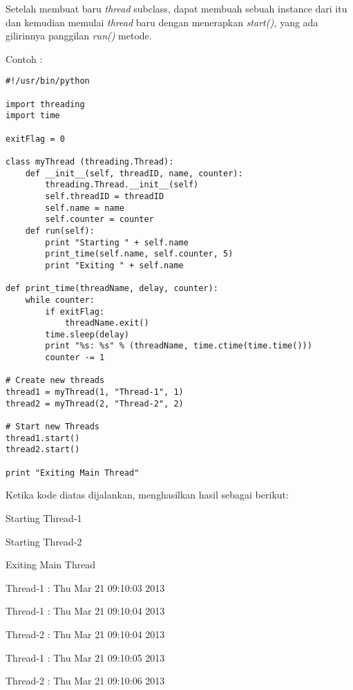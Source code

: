 \documentclass [12pt,a4paper,notitlepage,oneside,bahasa]{article}
\begin{document}
\vspace{12pt}
Setelah membuat baru \textit{thread} subclass, dapat membuah sebuah instance dari itu dan kemudian memulai \textit{thread} baru dengan menerapkan \textit{start(),} yang ada gilirinnya panggilan \textit{run()} metode. \par
\vspace{12pt}
	Contoh :
\begin{verbatim}
#!/usr/bin/python

import threading
import time

exitFlag = 0

class myThread (threading.Thread):
    def __init__(self, threadID, name, counter):
        threading.Thread.__init__(self)
        self.threadID = threadID
        self.name = name
        self.counter = counter
    def run(self):
        print "Starting " + self.name
        print_time(self.name, self.counter, 5)
        print "Exiting " + self.name

def print_time(threadName, delay, counter):
    while counter:
        if exitFlag:
            threadName.exit()
        time.sleep(delay)
        print "%s: %s" % (threadName, time.ctime(time.time()))
        counter -= 1

# Create new threads
thread1 = myThread(1, "Thread-1", 1)
thread2 = myThread(2, "Thread-2", 2)

# Start new Threads
thread1.start()
thread2.start()

print "Exiting Main Thread"
\end{verbatim}
	Ketika kode diatas dijalankan, menghasilkan hasil sebagai berikut:
\par
\noindent 
{\fontsize{10pt}{10pt}\selectfont Starting Thread-1} \par
\noindent 
{\fontsize{10pt}{10pt}\selectfont Starting Thread-2} \par
\noindent 
{\fontsize{10pt}{10pt}\selectfont Exiting Main Thread} \par
\noindent 
{\fontsize{10pt}{10pt}\selectfont Thread-1 : Thu Mar 21 09:10:03 2013} \par
\noindent 
{\fontsize{10pt}{10pt}\selectfont Thread-1 : Thu Mar 21 09:10:04 2013} \par
\noindent 
{\fontsize{10pt}{10pt}\selectfont Thread-2 : Thu Mar 21 09:10:04 2013} \par
\noindent 
{\fontsize{10pt}{10pt}\selectfont Thread-1 : Thu Mar 21 09:10:05 2013} \par
\noindent 
{\fontsize{10pt}{10pt}\selectfont Thread-2 : Thu Mar 21 09:10:06 2013} \par
\end{document}
